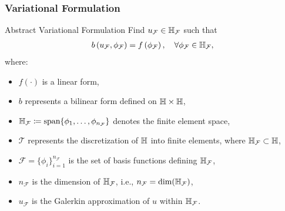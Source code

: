 \begin{frame}
\frametitle{Variational Formulation}
    \begin{block}{Abstract Variational Formulation}
        Find $u_{\mathcal{F}} \in \mathbb{H}_{\mathcal{F}}$ such that
        \begin{align}
        \label{eq:directH1}
            b\left(u_{\mathcal{F}},\phi_{\mathcal{F}}\right) = f\left(\phi_{\mathcal{F}}\right), \quad \forall \phi_{\mathcal{F}} \in \mathbb{H}_{\mathcal{F}},
        \end{align}
        where:
        \begin{itemize}
            \item $f(\cdot)$ is a linear form,
            \item $b$ represents a bilinear form defined on $\mathbb{H} \times \mathbb{H}$,
            \item $\mathbb{H}_{\mathcal{F}} \coloneqq \textrm{span}\{\phi_{1}, \dots, \phi_{n_{\mathcal{F}}}\}$ denotes the finite element space,
            \item $\mathcal{T}$ represents the discretization of $\mathbb{H}$ into finite elements, where $\mathbb{H}_{\mathcal{F}} \subset \mathbb{H}$,
            \item $\mathcal{F} = \{\phi_{i}\}_{i=1}^{n_{\mathcal{F}}}$ is the set of basis functions defining $\mathbb{H}_{\mathcal{F}}$,
            \item $n_{\mathcal{F}}$ is the dimension of $\mathbb{H}_{\mathcal{F}}$, i.e., $n_{\mathcal{F}} = \textrm{dim}(\mathbb{H}_{\mathcal{F}})$,
            \item $u_{\mathcal{F}}$ is the Galerkin approximation of $u$ within $\mathbb{H}_{\mathcal{F}}$.
        \end{itemize}
    \end{block}     
\end{frame}

